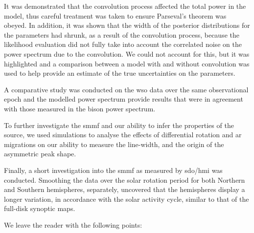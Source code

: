 It was demonstrated that the convolution process affected the total power in the model, thus careful treatment was taken to ensure Parseval's theorem was obeyed. In addition, it was shown that the width of the posterior distributions for the parameters had shrunk, as a result of the convolution process, because the likelihood evaluation did not fully take into account the correlated noise on the power spectrum due to the convolution. We could not account for this, but it was highlighted and a comparison between a model with and without convolution was used to help provide an estimate of the true uncertainties on the parameters.

A comparative study was conducted on the \gls{wso} data over the same observational epoch and the modelled power spectrum provide results that were in agreement with those measured in the \gls{bison} power spectrum.

To further investigate the \gls{smmf} and our ability to infer the properties of the source, we used simulations to analyse the effects of differential rotation and \gls{ar} migrations on our ability to measure the line-width, and the origin of the asymmetric peak shape.

Finally, a short investigation into the \gls{smmf} as measured by \gls{sdo/hmi} was conducted. Smoothing the data over the solar rotation period for both Northern and Southern hemispheres, separately, uncovered that the hemispheres display a longer variation, in accordance with the solar activity cycle, similar to that of the full-disk synoptic maps.

We leave the reader with the following points:

